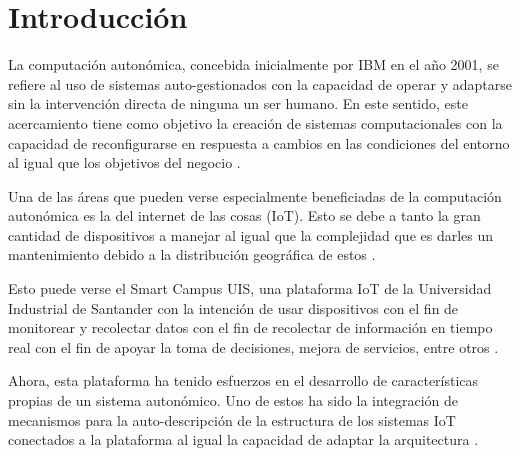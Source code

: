 \documentclass[12pt]{article}
\begin{document}
    
    
    \section{Introducción}


    La computación autonómica, concebida inicialmente por IBM en el año 2001, se refiere al uso de sistemas auto-gestionados con la capacidad de operar y adaptarse sin la intervención directa de ninguna un ser humano. En este sentido, este acercamiento tiene como objetivo la creación de sistemas computacionales con la capacidad de reconfigurarse en respuesta a cambios en las condiciones del entorno al igual que los objetivos del negocio \cite{horn_2001}.



    Una de las áreas que pueden verse especialmente beneficiadas de la computación autonómica es la del internet de las cosas (IoT). Esto se debe a tanto la gran cantidad de dispositivos a manejar al igual que la complejidad que es darles un mantenimiento debido a la distribución geográfica de estos \cite{Tahir_2019}. 
    
    Esto puede verse el Smart Campus UIS, una plataforma IoT de la Universidad Industrial de Santander con la intención de usar dispositivos con el fin de monitorear y recolectar datos con el fin de recolectar de información en tiempo real con el fin de apoyar la toma de decisiones, mejora de servicios, entre otros \cite{henry_2020}.

    Ahora, esta plataforma ha tenido esfuerzos en el desarrollo de características propias de un sistema autonómico. Uno de estos ha sido la integración de mecanismos para la auto-descripción de la estructura de los sistemas IoT conectados a la plataforma al igual la capacidad de adaptar la arquitectura \cite{henry_2020}. %
    
\end{document}
